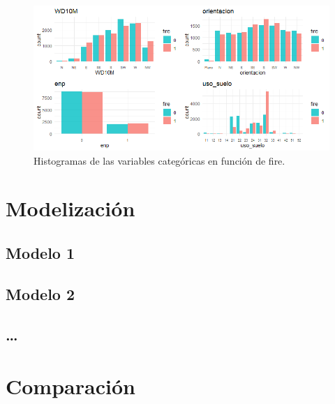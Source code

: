 \documentclass[12pt,a4paper,]{book}
\numberwithin{dummy}{section}
\theoremstyle{ocrenumbox}
\theoremstyle{blacknumex}
\theoremstyle{blacknumbox}
\theoremstyle{ocrenum}
\theoremstyle{ocrenum}
\begin{document}
\begin{figure}[h]
\centering
\includegraphics[width =\textwidth]{graficos/histogramas.png}
\caption{Histogramas de las variables categóricas en función de fire.}
\label{fig:histogramas}
\end{figure}

\hypertarget{modelizaciuxf3n}{%
\section{Modelización}\label{modelizaciuxf3n}}

\hypertarget{modelo-1}{%
\subsection{Modelo 1}\label{modelo-1}}

\hypertarget{modelo-2}{%
\subsection{Modelo 2}\label{modelo-2}}

\hypertarget{section}{%
\subsection{\ldots{}}\label{section}}

\hypertarget{comparaciuxf3n}{%
\section{Comparación}\label{comparaciuxf3n}}




%
\end{document}
